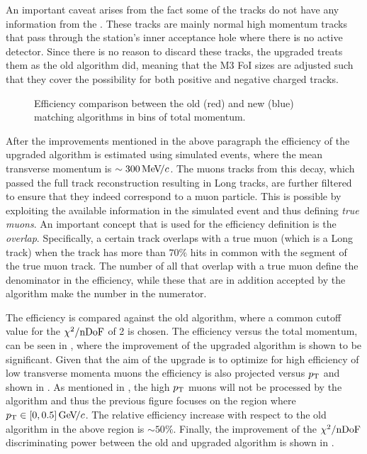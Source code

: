 An important caveat arises from the fact some of the \veloTTracks tracks do not have any information from
the \ttracker. These tracks are mainly normal high momentum tracks that pass through the \ttracker station's inner
acceptance hole where there is no active detector. Since there is no reason to discard these tracks, the upgraded
\mvTTm treats them as the old \mvm algorithm did, meaning that the M3 FoI sizes are adjusted such that they cover
the possibility for both positive and negative charged tracks.

\begin{figure}[t]
  \centering
    \scalebox{.6}{}
  \caption{Efficiency comparison between the old (red) and new (blue) matching algorithms in bins of total momentum.}
 \label{mvm_eff_p_comp}
\end{figure}

After the improvements mentioned in the above paragraph the efficiency of the upgraded \mvTTm algorithm
is estimated using simulated \Sigmapmumu events, where the mean transverse momentum is $\sim 300{\mathrm{\,Me\kern -0.1em V\!/}c}$.
The muons tracks from this decay, which passed the full track reconstruction resulting in Long tracks,
are further filtered to ensure that they indeed correspond to a muon particle. This is possible by
exploiting the available information in the simulated event and thus defining {\it true muons}.
An important concept that is used for the \mvTTm efficiency definition is the {\it overlap}.
Specifically, a certain \velo track overlaps with a true muon (which is a Long track)
when the \velo track has more than $70\%$ \velo hits in common with the \velo segment
of the true muon track. The number of all \veloTTracks that overlap with a true muon define the
denominator in the \mvTTm efficiency, while these \veloTTracks that are in addition accepted by
the \mvTTm algorithm make the number in the numerator.

The efficiency is compared against the old
\mvm algorithm, where a common cutoff value for the $\chi^2/\rm nDoF$ of 2 is chosen. The efficiency
versus the total momentum, can be seen in , where the improvement of the
upgraded \mvTTm algorithm is shown to be significant.  Given that the aim of the \mvTTm upgrade
is to optimize for high efficiency of low transverse momenta muons the efficiency is also projected
versus $\mbox{$p_{\rm T}$}$ and shown in . As mentioned in , the
high $\mbox{$p_{\rm T}$}$ muons will not be processed by the \mvTTm algorithm and thus the previous figure focuses on
the region where $\mbox{$p_{\rm T}$}\in[0,0.5]{\mathrm{\,Ge\kern -0.1em V\!/}c}$. The relative efficiency increase with respect to the old
\mvm algorithm in the above region is $\sim 50\%$. Finally, the improvement of the $\chi^2/\rm nDoF$
discriminating power between the old and upgraded algorithm is shown in .

